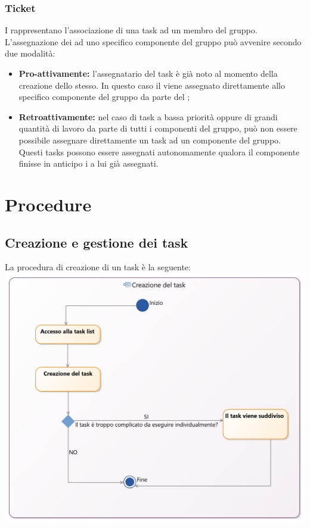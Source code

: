 \documentclass[NormeDiProgetto.tex]{subfiles}
\begin{document}
	\subsubsection{Ticket}
	I  rappresentano l'associazione di una task ad un membro del gruppo.
	L'assegnazione dei  ad uno specifico componente del gruppo può avvenire secondo due modalità:
	\begin{itemize}
		\item \textbf{Pro-attivamente:} l'assegnatario del task è già noto al momento della creazione dello stesso. In questo caso il  viene assegnato direttamente allo specifico componente del gruppo da parte del \respdiprog; 
		\item \textbf{Retroattivamente:} nel caso di task a bassa priorità oppure di grandi quantità di lavoro da parte di tutti i componenti del gruppo, può non essere possibile assegnare direttamente un task ad un componente del gruppo. Questi tasks possono essere assegnati autonomamente qualora il componente finisse in anticipo i  a lui già assegnati.
	\end{itemize}
	
	\section{Procedure}
	\subsection{Creazione e gestione dei task}	
	La procedura di creazione di un task è la seguente: \\
	\includegraphics[scale=0.3]{../../common/images/TaskCreation}		
	
\end{document}
